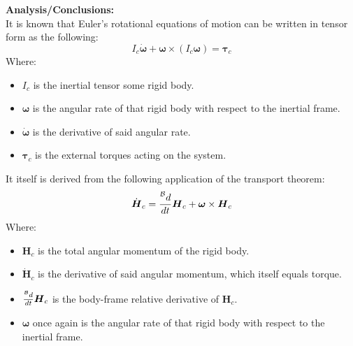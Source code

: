 \documentclass[titlepage]{article}
\begin{document}
\textbf{Analysis/Conclusions:}\\

It is known that Euler's rotational equations of motion can be written in tensor form as the following:
\begin{equation}
	I_c\dot{\boldsymbol{\omega}}+\boldsymbol{\omega}\times\left(I_c\boldsymbol{\omega}\right)=\boldsymbol{\tau}_c
	\label{eq:euler}
\end{equation}
Where:
\begin{itemize}
	\item $I_c$ is the inertial tensor some rigid body.
	\item $\boldsymbol{\omega}$ is the angular rate of that rigid body with respect to the inertial frame.
	\item $\dot{\boldsymbol{\omega}}$ is the derivative of said angular rate.
	\item $\boldsymbol{\tau}_c$ is the external torques acting on the system.
\end{itemize}

It itself is derived from the following application of the transport theorem:
\begin{equation}
	\dot{\boldsymbol{H}}_c=\frac{\prescript{\mathcal{B}}{}{d}}{dt}\boldsymbol{H}_c+\boldsymbol{\omega}\times\boldsymbol{H}_c
	\label{eq:transportH}
\end{equation}
Where:
\begin{itemize}
	\item $\boldsymbol{H}_c$ is the total angular momentum of the rigid body.
	\item $\dot{\boldsymbol{H}}_c$ is the derivative of said angular momentum, which itself equals torque.
	\item $\frac{\prescript{\mathcal{B}}{}{d}}{dt}\boldsymbol{H}_c$ is the body-frame relative derivative of $\boldsymbol{H}_c$.
	\item $\boldsymbol{\omega}$ once again is the angular rate of that rigid body with respect to the inertial frame.
\end{itemize}
\end{document}

